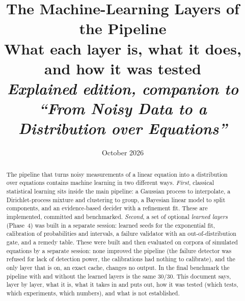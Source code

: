

\title{\textbf{The Machine-Learning Layers of the Pipeline}\\[4pt]
\large What each layer is, what it does, and how it was tested\\[2pt]\normalsize\textit{Explained edition, companion to ``From Noisy Data to a Distribution over Equations''}}
\author{}
\date{October 2026}

\let\oldsection\section\renewcommand{\section}{\Needspace{9\baselineskip}\oldsection}
\let\oldsubsection\subsection\renewcommand{\subsection}{\Needspace{7\baselineskip}\oldsubsection}

\maketitle

\begin{abstract}
\noindent
The pipeline that turns noisy measurements of a linear equation into a distribution over equations contains machine learning in two different ways. \emph{First}, classical statistical learning sits inside the main pipeline: a Gaussian process to interpolate, a Dirichlet-process mixture and clustering to group, a Bayesian linear model to split components, and an evidence-based decider with a refinement fit. These are implemented, committed and benchmarked. \emph{Second}, a set of optional \emph{learned layers} (Phase~4) was built in a separate session: learned seeds for the exponential fit, calibration of probabilities and intervals, a failure validator with an out-of-distribution gate, and a remedy table. These were built and then evaluated on corpora of simulated equations by a separate session: none improved the pipeline (the failure detector was refused for lack of detection power, the calibrations had nothing to calibrate), and the only layer that is on, an exact cache, changes no output. In the final benchmark the pipeline with and without the learned layers is the same $30/30$. This document says, layer by layer, what it is, what it takes in and puts out, how it was tested (which tests, which experiments, which numbers), and what is not established.
\end{abstract}

